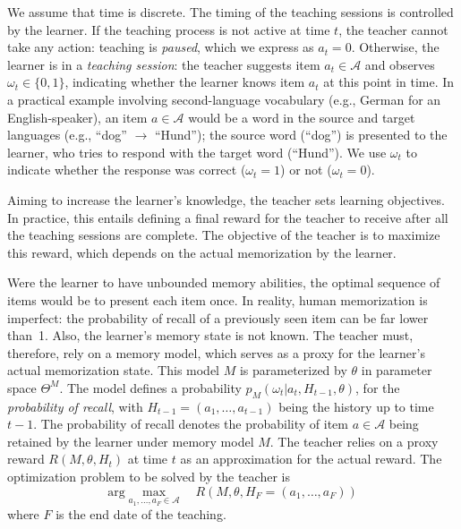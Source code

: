 \documentclass[manuscript,screen,review]{acmart}
\begin{document}
We assume that time is discrete.
The timing of the teaching sessions is controlled by the learner.
If the teaching process is not active at time $t$, the teacher cannot take any action: teaching is \textit{paused}, which we express as $a_t = 0$.
Otherwise, the learner is in a \textit{teaching session}: the teacher suggests item $a_t \in \mathcal{A}$ and observes $\omega_t \in \lbrace 0, 1 \rbrace$, indicating whether the learner knows item $a_t$ at this point in time.
In a practical example involving second-language vocabulary (e.g., German for an English-speaker), an item $a \in \mathcal{A}$ would be a word in the source and target languages (e.g., ``dog'' $\rightarrow$ ``Hund''); the source word (``dog'') is presented to the learner, who tries to respond with the target word (``Hund'').
We use $\omega_t$ to indicate whether the response was correct ($\omega_t = 1$) or not ($\omega_t = 0$).

Aiming to increase the learner's knowledge, the teacher sets learning objectives.
In practice, this entails defining a final reward for the teacher to receive after all the teaching sessions are complete.
The objective of the teacher is to maximize this reward, which depends on the actual memorization by the learner.

Were the learner to have unbounded memory abilities, the optimal sequence of items would be to present each item once.
In reality, human memorization is imperfect: the probability of recall of a previously seen item can be far lower than~1. Also, the learner's memory state is not known. The teacher must, therefore, rely on a memory model, which serves as a proxy for the learner's actual memorization state.
This model $M$ is parameterized by $\theta$ in parameter space $\Theta^M$. The model defines a probability $p_M(\omega_t | a_{t}, H_{t-1}, \theta)$, for the \textit{probability of recall}, with $H_{t-1} = (a_1, \dotsc, a_{t-1})$ being the history up to time $t-1$. The probability of recall denotes the probability of item $a \in \mathcal{A}$ being retained by the learner under  memory model $M$.
The teacher relies on a proxy reward $R(M, \theta, H_t)$ at time $t$ as an approximation for the actual reward. The optimization problem to be solved by the teacher is
\begin{equation}
    \text{arg}\max_{a_1, \dotsc, a_F \in \mathcal{A}} \quad R(M, \theta, H_F = (a_1, \dotsc, a_F))
    \label{eqn:objective}
\end{equation}
where $F$ is the end date of the teaching.
\end{document}
